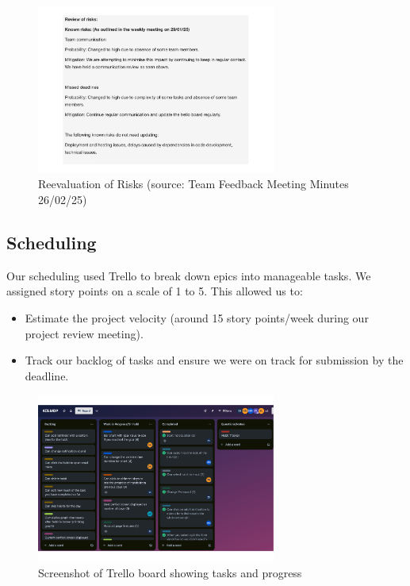 \begin{figure}[H]
    \centering
    \includegraphics[width=0.7\textwidth]{resources/risk_review.pdf}
    \caption{Reevaluation of Risks (source: Team Feedback Meeting Minutes 26/02/25)}
    \label{fig:reeval_risks}
\end{figure}

\subsection{Scheduling}
Our scheduling used Trello to break down epics into manageable tasks. We assigned story points on a scale of 1 to 5. This allowed us to:
\begin{itemize}
    \item Estimate the project velocity (around 15 story points/week during our project review meeting).
    \item Track our backlog of tasks and ensure we were on track for submission by the deadline.
\end{itemize}

\begin{figure}[H]
    \centering
    \includegraphics[width=0.7\textwidth]{resources/trello_board.pdf}
    \caption{Screenshot of Trello board showing tasks and progress}
    \label{fig:trello_tasks}
\end{figure}

